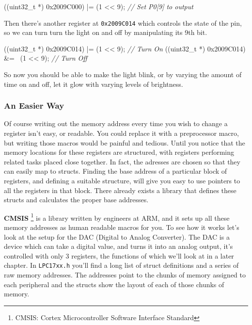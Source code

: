 \documentclass[]{article}
\newenvironment{Shaded}{\begin{snugshade}}{\end{snugshade}}
\newcommand{\DataTypeTok}[1]{\textcolor[rgb]{0.13,0.29,0.53}{{#1}}}
\newcommand{\DecValTok}[1]{\textcolor[rgb]{0.00,0.00,0.81}{{#1}}}
\newcommand{\BaseNTok}[1]{\textcolor[rgb]{0.00,0.00,0.81}{{#1}}}
\newcommand{\CommentTok}[1]{\textcolor[rgb]{0.56,0.35,0.01}{\textit{{#1}}}}
\newcommand{\NormalTok}[1]{{#1}}
\begin{document}
\begin{Shaded}
\begin{Highlighting}[]
    \NormalTok{((}\DataTypeTok{uint32_t} \NormalTok{*) }\BaseNTok{0x2009C000}\NormalTok{) |= (}\DecValTok{1} \NormalTok{<< }\DecValTok{9}\NormalTok{); }\CommentTok{// Set P0[9] to output}
\end{Highlighting}
\end{Shaded}

Then there's another register at \texttt{0x2009C014} which controls the
state of the pin, so we can turn turn the light on and off by
manipulating its 9th bit.

\begin{Shaded}
\begin{Highlighting}[]
    \NormalTok{((}\DataTypeTok{uint32_t} \NormalTok{*) }\BaseNTok{0x2009C014}\NormalTok{) |= (}\DecValTok{1} \NormalTok{<< }\DecValTok{9}\NormalTok{);  }\CommentTok{// Turn On}
    \NormalTok{((}\DataTypeTok{uint32_t} \NormalTok{*) }\BaseNTok{0x2009C014}\NormalTok{) &= ~(}\DecValTok{1} \NormalTok{<< }\DecValTok{9}\NormalTok{); }\CommentTok{// Turn Off}
\end{Highlighting}
\end{Shaded}

So now you should be able to make the light blink, or by varying the
amount of time on and off, let it glow with varying levels of
brightness.

\subsubsection{An Easier Way}

Of course writing out the memory address every time you wish to change a
register isn't easy, or readable. You could replace it with a
preprocessor macro, but writing those macros would be painful and
tedious. Until you notice that the memory locations for these registers
are structured, with registers performing related tasks placed close
together. In fact, the adresses are chosen so that they can easily map
to structs. Finding the base address of a particular block of registers,
and defining a suitable structure, will give you easy to use pointers to
all the registers in that block. There already exists a library that
defines these structs and calculates the proper base addresses.

\textbf{CMSIS} \footnote{CMSIS: Cortex Microcontroller Software
  Interface Standard} is a library written by engineers at ARM, and it
sets up all these memory addresses as human readable macros for you. To
see how it works let's look at the setup for the DAC (Digital to Analog
Converter). The DAC is a device which can take a digital value, and
turns it into an analog output, it's controlled with only 3 registers,
the functions of which we'll look at in a later chapter. In
\texttt{LPC17xx.h} you'll find a long list of struct definitions and a
series of raw memory addresses. The addresses point to the chunks of
memory assigned to each peripheral and the structs show the layout of
each of those chunks of memory.
\end{document}
